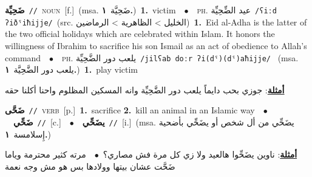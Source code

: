 \documentclass[10pt,a4paper,twoside]{article} %
\begin{document}
\begin{multicols}{2}
{\setlength\topsep{0pt}\textbf{\foreignlanguage{arabic}{ضَحِيِّة}}\ {\color{gray}\texttt{//}\color{black}}\ \textsc{noun}\ [f.]\ \color{gray}(msa. \foreignlanguage{arabic}{ضَحِيَّة}~\foreignlanguage{arabic}{\textbf{١.}})\color{black}\ \textbf{1.}~victim\ \ $\bullet$\ \ \textsc{ph.} \color{gray} \foreignlanguage{arabic}{عيد الضِّحِيِّة}\color{black}\ {\color{gray}\texttt{/{\sffamily ʕiːd ʔiðˤiħijje}/}\color{black}}\ \color{gray}(src. \foreignlanguage{arabic}{الخليل > الظاهرية > الرماضين})\color{black}\ \textbf{1.}~Eid al-Adha is the latter of the two official holidays which are celebrated within Islam. It honors the willingness of Ibrahim to sacrifice his son Ismail as an act of obedience to Allah's command\ \ $\bullet$\ \ \textsc{ph.} \color{gray} \foreignlanguage{arabic}{يلعب دور الضَّحِيِّة}\color{black}\ {\color{gray}\texttt{/{\sffamily jilʕab doːr ʔi(dˤ)(dˤ)aħijje}/}\color{black}}\ \color{gray} (msa. \foreignlanguage{arabic}{يلعب دور الضَّحِيَّة}~\foreignlanguage{arabic}{\textbf{١.}})\color{black}\ \textbf{1.}~play victim\  \begin{flushright}\color{gray}\foreignlanguage{arabic}{\textbf{\underline{\foreignlanguage{arabic}{أمثلة}}}: جوزي بحب دايماً يلعب دور الضَّحِيِّة وانه المسكين المظلوم واحنا أكلنا حقه}\end{flushright}\color{black}} \vspace{2mm}

{\setlength\topsep{0pt}\textbf{\foreignlanguage{arabic}{ضَحَّى}}\ {\color{gray}\texttt{//}\color{black}}\ \textsc{verb}\ [p.]\ \textbf{1.}~sacrifice  \textbf{2.}~kill an animal in an Islamic way\ \ $\bullet$\ \ \setlength\topsep{0pt}\textbf{\foreignlanguage{arabic}{ضَحِّي}}\ {\color{gray}\texttt{//}\color{black}}\ [c.]\ \ $\bullet$\ \ \setlength\topsep{0pt}\textbf{\foreignlanguage{arabic}{يضَحِّي}}\ {\color{gray}\texttt{//}\color{black}}\ [i.]\ \color{gray}(msa. \foreignlanguage{arabic}{يضَحِّي من أل شخص أو يضَحِّي بأضحية إِسلامسة}~\foreignlanguage{arabic}{\textbf{١.}})\color{black}\  \begin{flushright}\color{gray}\foreignlanguage{arabic}{\textbf{\underline{\foreignlanguage{arabic}{أمثلة}}}: ناوين يضَحِّوا هالعيد ولا زي كل مرة فش مصاري؟\ $\bullet$\ \  مرته كثير محترمة وياما ضَحَّت عشان بيتها وولادها بس هو مش وجه نعمة}\end{flushright}\color{black}} \vspace{2mm}


\end{multicols}
\end{document}
